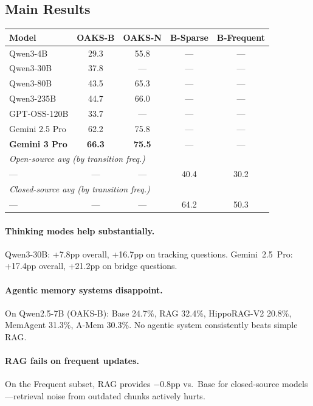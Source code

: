 \documentclass[11pt]{article}
\begin{document}
\subsection{Main Results}

\begin{table}[h]
\centering
\small
\begin{tabular}{lcccc}
\toprule
\textbf{Model} & \textbf{OAKS-B} & \textbf{OAKS-N} & \textbf{B-Sparse} & \textbf{B-Frequent} \\
\midrule
Qwen3-4B & 29.3 & 55.8 & --- & --- \\
Qwen3-30B & 37.8 & --- & --- & --- \\
Qwen3-80B & 43.5 & 65.3 & --- & --- \\
Qwen3-235B & 44.7 & 66.0 & --- & --- \\
GPT-OSS-120B & 33.7 & --- & --- & --- \\
Gemini 2.5 Pro & 62.2 & 75.8 & --- & --- \\
\textbf{Gemini 3 Pro} & \textbf{66.3} & \textbf{75.5} & --- & --- \\
\midrule
\multicolumn{5}{l}{\emph{Open-source avg (by transition freq.)}} \\
--- & --- & --- & 40.4 & 30.2 \\
\multicolumn{5}{l}{\emph{Closed-source avg (by transition freq.)}} \\
--- & --- & --- & 64.2 & 50.3 \\
\bottomrule
\end{tabular}
\end{table}

\paragraph{Thinking modes help substantially.} Qwen3-30B: +7.8pp overall, +16.7pp on tracking questions. Gemini~2.5~Pro: +17.4pp overall, +21.2pp on bridge questions.

\paragraph{Agentic memory systems disappoint.} On Qwen2.5-7B (OAKS-B): Base 24.7\%, RAG 32.4\%, HippoRAG-V2 20.8\%, MemAgent 31.3\%, A-Mem 30.3\%. No agentic system consistently beats simple RAG.

\paragraph{RAG fails on frequent updates.} On the Frequent subset, RAG provides $-$0.8pp vs.\ Base for closed-source models---retrieval noise from outdated chunks actively hurts.
\end{document}
